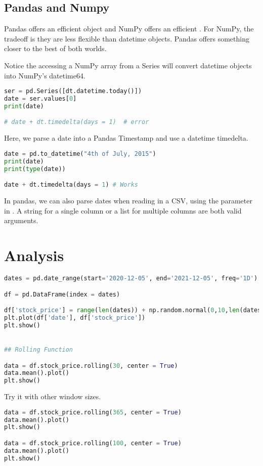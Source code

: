 \subsection{Pandas and Numpy}
Pandas offers an efficient  object and NumPy offers an efficient . For NumPy, the tradeoff is they are less flexible than datetime objects. Pandas offers something closer to the best of both worlds.

Notice the accessing a NumPy array from a Series will convert datetime objects into NumPy's datetime64. 

\begin{lstlisting}[language = Python]
ser = pd.Series([dt.datetime.today()])
date = ser.values[0]
print(date)

# date + dt.timedelta(days = 1)  # error
\end{lstlisting}

Here, we parse a date into a Pandas Timestamp and use a datetime timedelta. 

\begin{lstlisting}[language = Python]
date = pd.to_datetime("4th of July, 2015")
print(date)
print(type(date))

date + dt.timedelta(days = 1) # Works
\end{lstlisting}


In pandas, we can also parse dates when reading in a CSV, using the  parameter in . A string for a single column or a list for multiple columns are both valid arguments. 

\section{Analysis}

\begin{lstlisting}[language = Python]
dates = pd.date_range(start='2020-12-05', end='2021-12-05', freq='1D')

df = pd.DataFrame(index = dates)

df['stock_price'] = range(len(dates)) + np.random.normal(0,10,len(dates))
plt.plot(df['date'], df['stock_price'])
plt.show()


## Rolling Function

data = df.stock_price.rolling(30, center = True)
data.mean().plot()
plt.show()
\end{lstlisting}

Try it with other window sizes. 

\begin{lstlisting}[language = Python]
data = df.stock_price.rolling(365, center = True)
data.mean().plot()
plt.show()

data = df.stock_price.rolling(100, center = True)
data.mean().plot()
plt.show()
\end{lstlisting}

